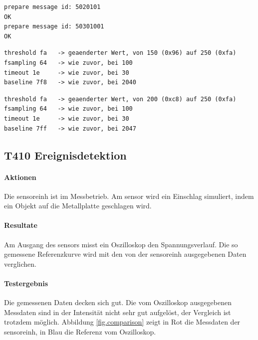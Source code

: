 \begin{lstlisting}[caption=T400 Sendeprotokoll am \gls{logger}, label=t400.4]
prepare message id: 5020101
OK
prepare message id: 50301001
OK
\end{lstlisting}

\begin{lstlisting}[caption=T400 Konfiguration aus Sensor 3, label=t400.5]
threshold fa   -> geaenderter Wert, von 150 (0x96) auf 250 (0xfa)
fsampling 64   -> wie zuvor, bei 100
timeout 1e     -> wie zuvor, bei 30
baseline 7f8   -> wie zuvor, bei 2040
\end{lstlisting}

\begin{lstlisting}[caption=T400 Konfiguration aus Sensor 2, label=t400.6]
threshold fa   -> geaenderter Wert, von 200 (0xc8) auf 250 (0xfa)
fsampling 64   -> wie zuvor, bei 100
timeout 1e     -> wie zuvor, bei 30
baseline 7ff   -> wie zuvor, bei 2047
\end{lstlisting}


\subsection{T410 Ereignisdetektion}
\paragraph{Aktionen} Die \gls{sensoreinh} ist im Messbetrieb. Am \gls{sensor} wird ein Einschlag simuliert, indem ein Objekt auf die Metallplatte geschlagen wird. 

\paragraph{Resultate} Am Ausgang des \gls{sensor}s misst ein Oszilloskop den Spannungsverlauf. Die so gemessene Referenzkurve wird mit den von der \gls{sensoreinh} ausgegebenen Daten verglichen.

\paragraph{Testergebnis} Die gemessenen Daten decken sich gut. Die vom Oszilloskop ausgegebenen Messdaten sind in der Intensität nicht sehr gut aufgelöst, der Vergleich ist trotzdem möglich. Abbildung \ref{fig.comparison} zeigt in Rot die Messdaten der \gls{sensoreinh}, in Blau die Referenz vom Oszilloskop.

